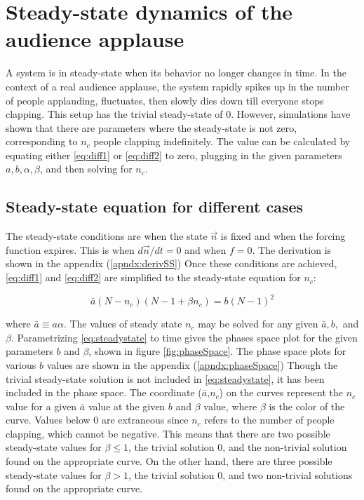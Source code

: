 \chapter{Steady-state dynamics of the audience applause}
\label{chap3}

\hspace{\parindent} A system is in steady-state when its behavior no longer changes in time. In the context of a real audience applause, the system rapidly spikes up in the number of people applauding, fluctuates, then slowly dies down till everyone stops clapping. This setup has the trivial steady-state of $0$.
However, simulations have shown that there are parameters where the steady-state is not zero, corresponding to $n_{c}$ people clapping indefinitely.
The value can be calculated by equating either \eqref{eq:diff1} or \eqref{eq:diff2} to zero, plugging in the given parameters $a, b, \alpha, \beta$, and then solving for $n_{c}$.

\section{Steady-state equation for different cases}

\hspace{\parindent} The steady-state conditions are when the state $\vec{n}$ is fixed and when the forcing function expires. 
This is when $d\vec{n}/dt = 0$ and when $f=0$.
The derivation is shown in the appendix (\ref{apndx:derivSS})
Once these conditions are achieved, \eqref{eq:diff1} and \eqref{eq:diff2} are simplified to the steady-state equation for $n_c$:

\begin{equation}\label{eq:steadystate}
\bar{a}(N-n_{c})(N-1 + \beta n_{c}) = b(N-1)^{2}
\end{equation}

where $\bar{a}\equiv a\alpha$. 
The values of steady state $n_{c}$ may be solved for any given $\bar{a},b,$ and $\beta$.
Parametrizing \eqref{eq:steadystate} to time gives the phases space plot for the given parameters $b$ and $\beta$, shown in figure \ref{fig:phaseSpace}.
The phase space plots for various $b$ values are shown in the appendix (\ref{apndx:phaseSpace})
Though the trivial steady-state solution is not included in \eqref{eq:steadystate}, it has been included in the phase space.
The coordinate ($\bar{a}$,$n_{c}$) on the curves represent the $n_{c}$ value for a given $\bar{a}$ value at the given $b$ and $\beta$ value, where $\beta$ is the color of the curve.
Values below $0$ are extraneous since $n_{c}$ refers to the number of people clapping, which cannot be negative.
This means that there are two possible steady-state values for $\beta \leq 1$, the trivial solution $0$, and the non-trivial solution found on the appropriate curve.
On the other hand, there are three possible steady-state values for $\beta > 1$, the trivial solution $0$, and two non-trivial solutions found on the appropriate curve.

